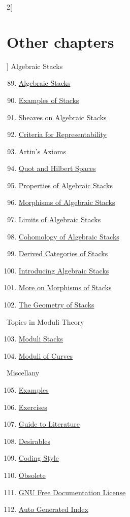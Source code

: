 \begin{multicols}{2}[\section{Other chapters}]
Algebraic Stacks
\begin{enumerate}
\setcounter{enumi}{88}
\item \hyperref[algebraic-section-phantom]{Algebraic Stacks}
\item \hyperref[examples-stacks-section-phantom]{Examples of Stacks}
\item \hyperref[stacks-sheaves-section-phantom]{Sheaves on Algebraic Stacks}
\item \hyperref[criteria-section-phantom]{Criteria for Representability}
\item \hyperref[artin-section-phantom]{Artin's Axioms}
\item \hyperref[quot-section-phantom]{Quot and Hilbert Spaces}
\item \hyperref[stacks-properties-section-phantom]{Properties of Algebraic Stacks}
\item \hyperref[stacks-morphisms-section-phantom]{Morphisms of Algebraic Stacks}
\item \hyperref[stacks-limits-section-phantom]{Limits of Algebraic Stacks}
\item \hyperref[stacks-cohomology-section-phantom]{Cohomology of Algebraic Stacks}
\item \hyperref[stacks-perfect-section-phantom]{Derived Categories of Stacks}
\item \hyperref[stacks-introduction-section-phantom]{Introducing Algebraic Stacks}
\item \hyperref[stacks-more-morphisms-section-phantom]{More on Morphisms of Stacks}
\item \hyperref[stacks-geometry-section-phantom]{The Geometry of Stacks}
\end{enumerate}
Topics in Moduli Theory
\begin{enumerate}
\setcounter{enumi}{102}
\item \hyperref[moduli-section-phantom]{Moduli Stacks}
\item \hyperref[moduli-curves-section-phantom]{Moduli of Curves}
\end{enumerate}
Miscellany
\begin{enumerate}
\setcounter{enumi}{104}
\item \hyperref[examples-section-phantom]{Examples}
\item \hyperref[exercises-section-phantom]{Exercises}
\item \hyperref[guide-section-phantom]{Guide to Literature}
\item \hyperref[desirables-section-phantom]{Desirables}
\item \hyperref[coding-section-phantom]{Coding Style}
\item \hyperref[obsolete-section-phantom]{Obsolete}
\item \hyperref[fdl-section-phantom]{GNU Free Documentation License}
\item \hyperref[index-section-phantom]{Auto Generated Index}
\end{enumerate}
\end{multicols}
